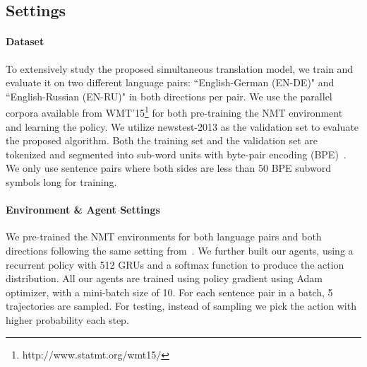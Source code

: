 \subsection{Settings}
\paragraph{Dataset}
To extensively study the proposed simultaneous translation model, we train and evaluate it on two different language pairs: ``English-German (EN-DE)" and ``English-Russian (EN-RU)" in both directions per pair. We use the parallel corpora available from WMT'15\footnote{http://www.statmt.org/wmt15/} for both pre-training the NMT environment and learning the policy. We utilize newstest-2013 as the validation set to evaluate the proposed algorithm. Both the training set and the validation set are tokenized and segmented into sub-word units with byte-pair encoding (BPE)~\cite{sennrich2015neural}. We only use sentence pairs where both sides are less than 50 BPE subword symbols long for training.

\paragraph{Environment \& Agent Settings}
We pre-trained the NMT environments for both language pairs and both directions following the same setting from~\cite{cho2016can}. %
We further built our agents, using a recurrent policy with 512 GRUs and a softmax function to produce the action distribution. All our agents are trained using policy gradient using Adam~\cite{kingma2014adam} optimizer, with a mini-batch size of 10. For each sentence pair in a batch, 5 trajectories are sampled. 
For testing, instead of sampling we pick the action with higher probability each step.



